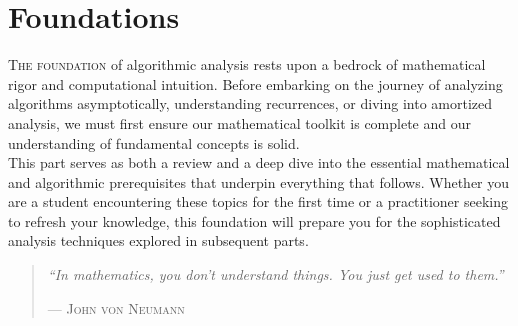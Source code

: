 \part{Foundations}
\label{part:foundations}

\begin{partintro}
	\lettrine[lines=3]{T}{he foundation} of algorithmic analysis rests upon a bedrock of mathematical rigor and computational intuition. Before embarking on the journey of analyzing algorithms asymptotically, understanding recurrences, or diving into amortized analysis, we must first ensure our mathematical toolkit is complete and our understanding of fundamental concepts is solid.
	\vspace{1em}\\
	This part serves as both a review and a deep dive into the essential mathematical and algorithmic prerequisites that underpin everything that follows. Whether you are a student encountering these topics for the first time or a practitioner seeking to refresh your knowledge, this foundation will prepare you for the sophisticated analysis techniques explored in subsequent parts.
	
	\vspace{1em}
	\begin{quote}
	\textit{``In mathematics, you don't understand things. You just get used to them.''}

	\hfill--- \textsc{John von Neumann}
	\end{quote}

\end{partintro}

